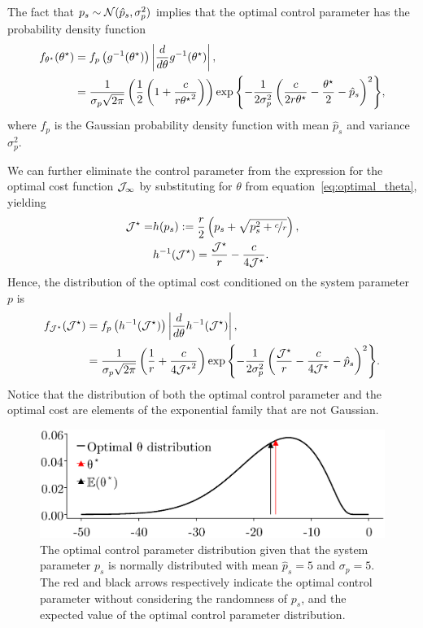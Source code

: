 %
The fact that $p_s \sim \mathcal{N}(\hat{p}_s, \sigma_p^2)$ implies that the optimal
control parameter has the probability density function
%
\begin{align*} 
    f_{\theta^\star}(\theta^\star) &= f_p\left(g^{-1}(\theta^\star)\right)
        \left|{\frac{d}{d\theta}g^{-1}(\theta^\star)}\right|, \\ 
        &= \frac{1}{\sigma_p
        \sqrt{2\pi}}\left(\frac{1}{2}\left(1+\frac{c}{r{\theta^\star}^2}\right)\right)
        \exp{\left\{-\frac{1}{2\sigma_p^2}\left(
        \frac{c}{2r\theta^\star} - \frac{\theta^\star}{2} - \hat{p}_s
        \right)^2\right\}}, 
\end{align*}
%
where $f_p$ is the Gaussian probability density function with mean $\hat{p}_s$ and
variance $\sigma_p^2$. 

We can further eliminate the control parameter from the
expression for the optimal cost function $\mathcal{J}_\infty$ by
substituting for $\theta$ from
equation~\eqref{eq:optimal_theta}, yielding 
%
\begin{align*}
\mathcal{J}^\star = &h(p_s) := \frac{r}{2}\left( p_s +
\sqrt{p_s^2 + \nicefrac{c}{r}} \right), \\
&h^{-1}(\mathcal{J}^\star) = \frac{\mathcal{J}^\star}{r} -
\frac{c}{4\mathcal{J}^\star}.
\end{align*}
%
Hence, the distribution of the optimal cost conditioned on the system parameter
$p$ is 
%
\begin{align*} 
    f_{\mathcal{J}^\star}(\mathcal{J}^\star) &=f_p\left(h^{-1}(\mathcal{J}^\star)\right)
        \left|{\frac{d}{d\theta}h^{-1}(\mathcal{J}^\star)}\right|, \\
        &= \frac{1}{\sigma_p
        \sqrt{2\pi}}\left(\frac{1}{r} + \frac{c}{4{\mathcal{J}^\star}^2}\right)
        \exp{\left\{ -\frac{1}{2\sigma_p^2} \left(
        \frac{\mathcal{J}^\star}{r} - \frac{c}{4\mathcal{J}^\star} -
        \hat{p}_s\right)^2\right\}}.
\end{align*}
%
Notice that the distribution of both the optimal control parameter and the
optimal cost are elements of the exponential family that are not Gaussian. 

\begin{figure}[tb]
  \centering
  \includegraphics[width=0.7\linewidth]{./figures/optimal-dist.eps}
  \caption{The optimal control parameter distribution given that the system
  parameter $p_s$ is normally distributed with mean $\hat{p}_s = 5$ and $\sigma_p
  = 5$. The red and black arrows respectively indicate the optimal control
  parameter without considering the randomness of $p_s$, and the expected value
  of the optimal control parameter distribution.}
  \label{fig:optimal_dist}
\end{figure}


